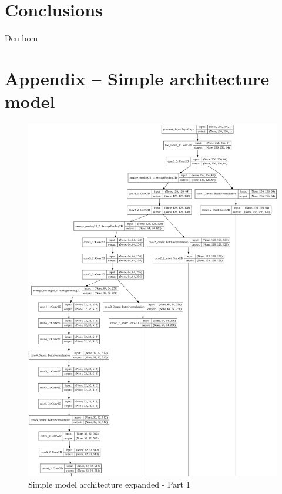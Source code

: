 \documentclass[12pt,openright,oneside,a4paper,english]{abntex2}
\begin{document}
\begin{otherlanguage}{english}
    \chapter{Conclusions}
    Deu bom

    \appendix
    \chapter{Appendix -- Simple architecture model}

    \begin{figure}[!htb]
    \centering
    \includegraphics[height=\textheight]{model_plot/Simple1}
    \caption{Simple model architecture expanded - Part 1}
    \label{simple_plot_1}
    \end{figure}


\end{otherlanguage}
\end{document}
